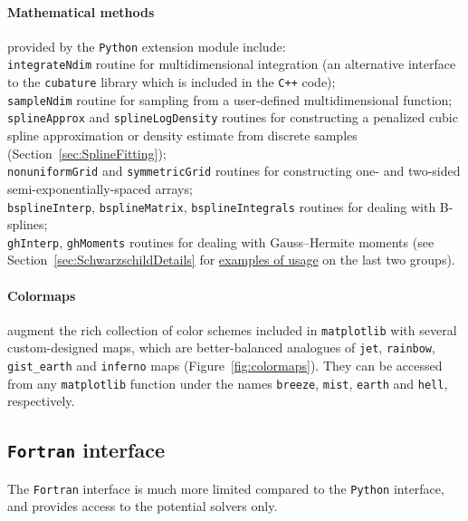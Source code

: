 \documentclass[12pt]{article}
\newcommand{\Cpp}  {\texttt{C++}\xspace}
\newcommand{\Python}{\texttt{Python}\xspace}
\newcommand{\Fortran}{\texttt{Fortran}\xspace}
\newcommand{\ppp}[1]{\textcolor{darkolive} {\texttt{#1}}}
\begin{document}
\paragraph{Mathematical methods} provided by the \Python extension module include:\\
\texttt{integrateNdim} routine for multidimensional integration (an alternative interface to the \texttt{cubature} library which is included in the \Cpp code);\\
\texttt{sampleNdim} routine for sampling from a user-defined multidimensional function;\\
\texttt{splineApprox} and \texttt{splineLogDensity} routines for constructing a penalized cubic spline approximation or density estimate from discrete samples (Section~\ref{sec:SplineFitting});\\
\texttt{nonuniformGrid} and \texttt{symmetricGrid} routines for constructing one- and two-sided semi-exponentially-spaced arrays;\\
\texttt{bsplineInterp}, \texttt{bsplineMatrix}, \texttt{bsplineIntegrals} routines for dealing with B-splines;\\
\texttt{ghInterp}, \texttt{ghMoments} routines for dealing with Gauss--Hermite moments (see Section~\ref{sec:SchwarzschildDetails} for \hyperref[sec:SchwarzschildExample]{examples of usage} on the last two groups).

\paragraph{Colormaps} augment the rich collection of color schemes included in \texttt{matplotlib} with several custom-designed maps, which are better-balanced analogues of \texttt{jet}, \texttt{rainbow}, \texttt{gist_earth} and \texttt{inferno} maps (Figure~\ref{fig:colormaps}). They can be accessed from any \texttt{matplotlib} function under the names \ppp{breeze}, \ppp{mist}, \ppp{earth} and \ppp{hell}, respectively.


\subsection{\Fortran interface}  \label{sec:Fortran}

The \Fortran interface is much more limited compared to the \Python interface, and provides access to the potential solvers only. 
\end{document}
